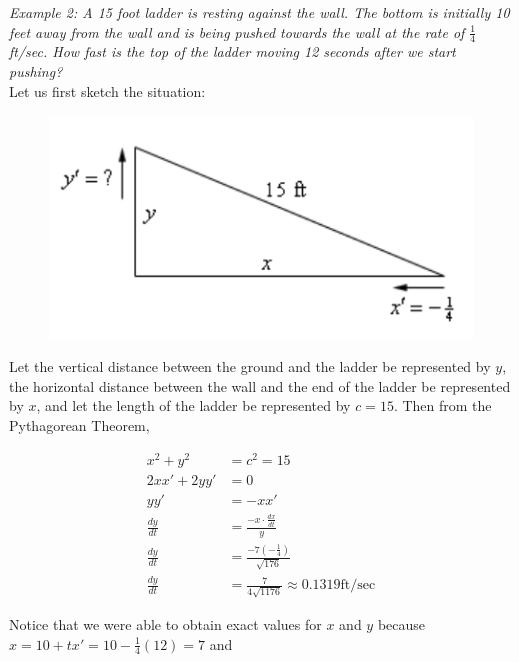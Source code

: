 \documentclass{article}
\begin{document}
        \noindent \color{blue} \textit{Example 2: A 15 foot ladder is resting against the wall.
        The bottom is initially 10 feet away from the wall and is being pushed towards the wall at
        the rate of $\frac{1}{4}$ ft/sec. How fast is the top of the ladder moving 12 seconds
        after we start pushing?} \color{black} \\

        \noindent Let us first sketch the situation: \\

        \begin{figure}[hbt!]
            \centering
            \includegraphics[scale=0.6]{Resources/Unit3DiffferentiationApps/Related_Rates_1}
        \end{figure}

        \noindent Let the vertical distance between the ground and the ladder be represented by $y$,
        the horizontal distance between the wall and the end of the ladder be represented by $x$,
        and let the length of the ladder be represented by $c=15$. Then from the Pythagorean Theorem,

        \begin{align*}
            x^2 + y^2       &= c^2 = 15 \\
            2xx' + 2yy'     &= 0 \\
            yy'             &= -xx' \\
            \frac{dy}{dt}   &= \frac{-x\cdot\frac{dx}{dt}}{y} \\
            \frac{dy}{dt}   &= \frac{-7(-\frac{1}{4})}{\sqrt{176}} \\
            \frac{dy}{dt}   &= \frac{7}{4\sqrt{1176}} \approx 0.1319 \text{ft/sec}
        \end{align*}

        Notice that we were able to obtain exact values for $x$ and $y$ because
        $x=10+tx'=10-\frac{1}{4}(12) = 7$ and
\end{document}
